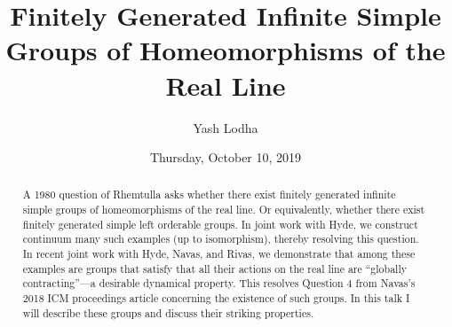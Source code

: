 \documentclass{UAmathtalk}
\author{Yash Lodha}
\title{Finitely Generated Infinite Simple Groups of Homeomorphisms of the Real Line}
\date{Thursday, October 10, 2019}
\begin{document}
\maketitle

\begin{abstract}
A 1980 question of Rhemtulla asks whether there exist finitely generated infinite simple groups of homeomorphisms of the real line. Or equivalently, whether there exist finitely generated simple left orderable groups. In joint work with Hyde, we construct continuum many such examples (up to isomorphism), thereby resolving this question. In recent joint work with Hyde, Navas, and Rivas, we demonstrate that among these examples are groups that satisfy that all their actions on the real line are ``globally contracting''---a desirable dynamical property. This resolves Question 4 from Navas's 2018 ICM proceedings article concerning the existence of such groups. In this talk I will describe these groups and discuss their striking properties.
\end{abstract}
\end{document}
